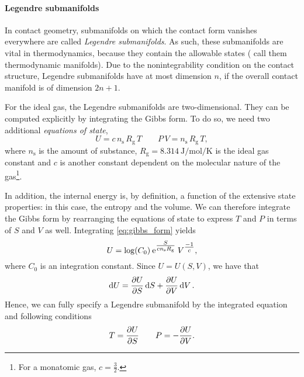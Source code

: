 \paragraph{Legendre submanifolds} In contact geometry, submanifolds on which the contact form vanishes everywhere are called \emph{Legendre submanifolds}. As such, these submanifolds are vital in thermodynamics, because they contain the allowable states (\citet{Balian2001} call them thermodynamic manifolds). Due to the nonintegrability condition on the contact structure, Legendre submanifolds have at most dimension \(n\), if the overall contact manifold is of dimension \(2n + 1\).

For the ideal gas, the Legendre submanifolds are two-dimensional. They can be computed explicitly by integrating the Gibbs form. To do so, we need two additional \emph{equations of state}, 
\begin{equation}
    U = c\, n_\text{s}\, R_\text{g}\, T \qquad P \, V = n_\text{s} \, R_\text{g} \, T,
\end{equation}
where \(n_\text{s}\) is the amount of substance, \(R_\text{g} = \SI{8.314}{\joule \per \mole \per \kelvin}\) is the ideal gas constant and \(c\) is another constant dependent on the molecular nature of the gas\footnote{For a monatomic gas, \(c = \tfrac{3}{2}\).}. 

In addition, the internal energy is, by definition, a function of the extensive state properties: in this case, the entropy and the volume. We can therefore integrate the Gibbs form by rearranging the equations of state to express \(T\) and \(P\) in terms of \(S\) and \(V\) as well. Integrating \cref{eq:gibbs_form} yields
\begin{equation}
     U = \log(C_0) \: \mathrm{e}^{\tfrac{S}{cn_\text{s}R_\text{g}}} \: V^{\tfrac{-1}{c}},
\end{equation}
where \(C_0\) is an integration constant. Since \( U = U(S, V)\), we have that
\begin{equation}
     \dd{U} = \pdv{U}{S}\dd{S} + \pdv{U}{V}\dd{V}.
\end{equation}
Hence, we can fully specify a Legendre submanifold by the integrated equation and following conditions
\begin{equation}
     T = \pdv{U}{S} \qquad P = -\pdv{U}{V}.
\end{equation}

